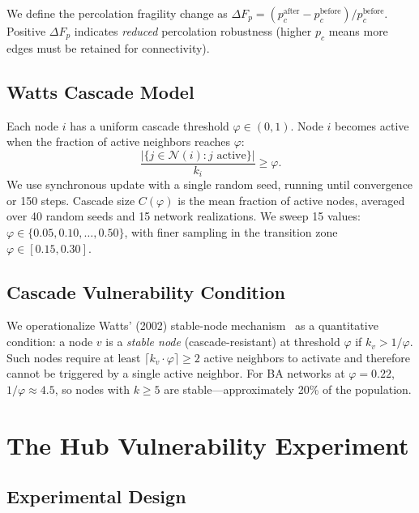 \documentclass[aps,pre,twocolumn,superscriptaddress,showpacs]{revtex4-2}
\newcommand{\pc}{p_c}
\newcommand{\DF}{\Delta F}
\begin{document}
We define the percolation fragility change as $\DF_p = (\pc^{\mathrm{after}} - \pc^{\mathrm{before}})/\pc^{\mathrm{before}}$. Positive $\DF_p$ indicates \emph{reduced} percolation robustness (higher $\pc$ means more edges must be retained for connectivity).

\subsection{Watts Cascade Model}

Each node $i$ has a uniform cascade threshold $\varphi \in (0,1)$. Node $i$ becomes active when the fraction of active neighbors reaches $\varphi$:
\begin{equation*}
\frac{|\{j \in \mathcal{N}(i) : j \text{ active}\}|}{k_i} \geq \varphi.
\end{equation*}
We use synchronous update with a single random seed, running until convergence or 150 steps. Cascade size $C(\varphi)$ is the mean fraction of active nodes, averaged over 40 random seeds and 15 network realizations. We sweep 15 values: $\varphi \in \{0.05, 0.10, \ldots, 0.50\}$, with finer sampling in the transition zone $\varphi \in [0.15, 0.30]$.

\subsection{Cascade Vulnerability Condition}

We operationalize Watts' (2002) stable-node mechanism~\cite{Watts2002} as a quantitative condition: a node $v$ is a \emph{stable node} (cascade-resistant) at threshold $\varphi$ if $k_v > 1/\varphi$. Such nodes require at least $\lceil k_v \cdot \varphi \rceil \geq 2$ active neighbors to activate and therefore cannot be triggered by a single active neighbor. For BA networks at $\varphi=0.22$, $1/\varphi \approx 4.5$, so nodes with $k \geq 5$ are stable---approximately 20\% of the population.

\section{The Hub Vulnerability Experiment}
\label{sec:hub_vuln}

\subsection{Experimental Design}
\end{document}
